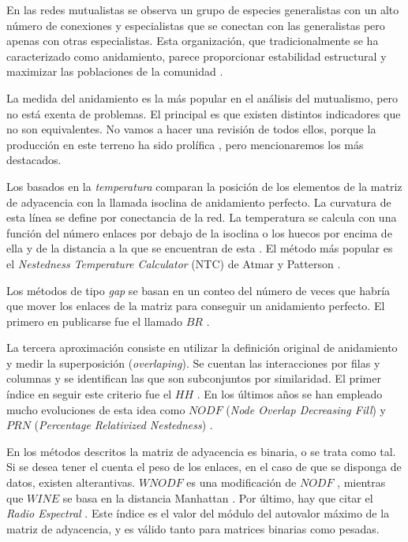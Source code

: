 En las redes mutualistas se observa un grupo de especies generalistas con un alto número de conexiones y especialistas que se conectan con las generalistas pero apenas con otras especialistas. Esta organización, que tradicionalmente se ha caracterizado como anidamiento, parece proporcionar estabilidad estructural y maximizar las poblaciones de la comunidad \cite{memmott2004tolerance,bastolla2009,thebault2010stability,suweis2013emergence}. 

La medida del anidamiento es la más popular en el análisis del mutualismo, pero no está exenta de problemas. El principal es que existen distintos indicadores que no son equivalentes. No vamos a hacer una revisión de todos ellos, porque la producción en este terreno ha sido prolífica \cite{ulrich2009consumer}, pero mencionaremos los más destacados. 

Los basados en la \textit{temperatura} comparan la posición de los elementos de la matriz de adyacencia con la llamada isoclina de anidamiento perfecto. La curvatura de esta línea se define por conectancia de la red. La temperatura se calcula con una función del número enlaces por debajo de la isoclina o los huecos por encima de ella y de la distancia a la que se encuentran de esta \cite{ulrich2007null}. El método más popular es el \textit{Nestedness Temperature Calculator} (NTC) de Atmar y Patterson \cite{atmar1995nestedness}.

Los métodos de tipo \textit{gap} se basan en un conteo del número de veces que habría que mover los enlaces de la matriz para conseguir un anidamiento perfecto. El primero en publicarse fue el llamado $BR$ \cite{brualdi1999nested}.

La tercera aproximación consiste en utilizar la definición original de anidamiento y medir la superposición (\textit{overlaping}). Se cuentan las interacciones por filas y columnas y se identifican las que son subconjuntos por similaridad. El primer índice en seguir este criterio fue el $HH$ \cite{hausdorf2003nestedness}. En los últimos años se han empleado mucho evoluciones de esta idea como $NODF$ (\textit{Node Overlap Decreasing Fill}) \cite{almeida2008consistent} y $PRN$ (\textit{Percentage Relativized Nestedness}) \cite{podani2012comparative}.

En los métodos descritos la matriz de adyacencia es binaria, o se trata como tal. Si se desea tener el cuenta el peso de los enlaces, en el
caso de que se disponga de datos, existen alterantivas. $WNODF$ es una modificación de $NODF$ \cite{almeida2011straightforward}, mientras que $WINE$ se basa en la distancia Manhattan \cite{galeano2009weighted}. Por último, hay que citar el \textit{Radio Espectral} \cite{staniczenko2013ghost}. Este índice es el valor del módulo del autovalor máximo de la matriz de adyacencia, y es válido tanto para matrices binarias como pesadas. 

